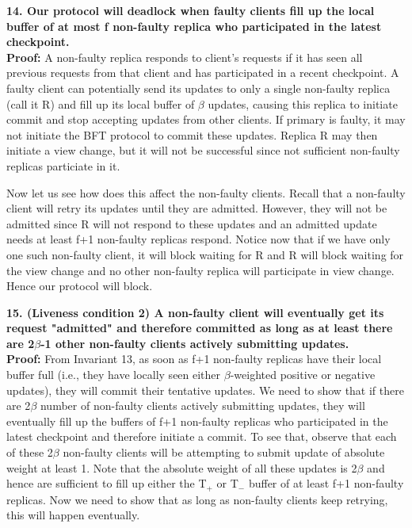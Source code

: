 \documentclass[twocolumn,10pt]{article}
\begin{document}
{\textbf{14. Our protocol will deadlock when faulty clients fill up the local buffer of at 
most f non-faulty replica who participated
in the latest checkpoint.}\\
\textbf{Proof:} 
A non-faulty replica responds to client's requests if it has seen all previous requests
from that client and has participated in a recent checkpoint. A faulty client can potentially
send its updates to only a single non-faulty replica (call it R) and fill up its local buffer of $\beta$
updates, causing this replica to initiate commit and stop accepting updates from other clients.
If primary is faulty, it may not initiate the BFT protocol to commit these updates. Replica R may
then initiate a view change, but it will not be successful since not sufficient non-faulty replicas
particiate in it. 

Now let us see how does this affect the non-faulty clients. Recall that a non-faulty client will
retry its updates until they are admitted. However, they will not be admitted since R will not 
respond to these updates and an admitted update needs at least f+1 non-faulty replicas respond. 
Notice now that if we have only one such non-faulty client, it will block waiting for R and R will
block waiting for the view change and no other non-faulty replica will participate in view change.
Hence our protocol will block.

\textbf{15. (Liveness condition 2) A non-faulty client will eventually 
get its request "admitted" and therefore committed as long as at least 
there are 2$\beta$-1 other non-faulty clients actively submitting updates.}\\
\textbf{Proof:} From Invariant 13, as soon as f+1 non-faulty replicas have
their local buffer full (i.e., they have locally seen either $\beta$-weighted positive or negative 
updates), they will 
commit their tentative updates. We need
to show that if there are 2$\beta$ number of non-faulty clients actively
submitting updates, they will eventually fill up the buffers of f+1 non-faulty
replicas who participated in the latest checkpoint and therefore initiate
a commit. To see that, observe that each of these 2$\beta$ non-faulty clients
will be attempting to submit update of absolute weight at least 1. Note that the absolute
weight of all these updates is 2$\beta$ and hence are sufficient to fill up either the 
T$_{+}$ or T$_{-}$  buffer of at least f+1 non-faulty replicas. Now we need to show that as long as
non-faulty clients keep retrying, this will happen eventually.

}
\end{document}
